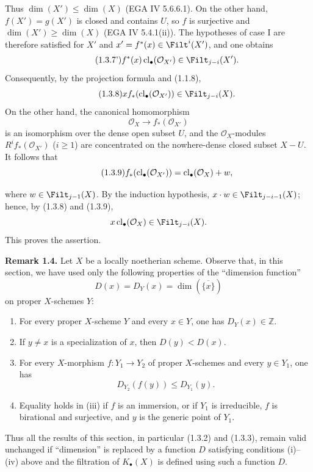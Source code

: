 Thus $\dim(X')\leq\dim(X)$ (EGA IV 5.6.6.1). On the other hand,
$f(X')=g(X')$ is closed and contains $U$, so $f$ is surjective and
$\dim(X')\geq\dim(X)$ (EGA IV 5.4.1(ii)). The hypotheses of case I are
therefore satisfied for $X'$ and $x'=f^*(x)\in\Filt^i(X')$, and one obtains
\begin{equation}\tag{1.3.7'}
f^*(x)\cl_\bullet(\mathcal O_{X'})\in\Filt_{j-i}(X').
\end{equation}
Consequently, by the projection formula and (1.1.8),
\begin{equation}\tag{1.3.8}
x f_*(\cl_\bullet(\mathcal O_{X'}))\in\Filt_{j-i}(X).
\end{equation}
On the other hand, the canonical homomorphism
\[
\mathcal O_X\longrightarrow f_*(\mathcal O_{X'})
\]
is an isomorphism over the dense open subset $U$, and the
$\mathcal O_X$-modules $R^if_*(\mathcal O_{X'})$ ($i\geq1$) are concentrated
on the nowhere-dense closed subset $X-U$. It follows that
\begin{equation}\tag{1.3.9}
f_*(\operatorname{cl}_\bullet(\mathcal O_{X'}))=\operatorname{cl}_\bullet(\mathcal O_X)+w,
\end{equation}

where $w\in\Filt_{j-1}(X)$. By the induction hypothesis,
$x\cdot w\in\Filt_{j-i-1}(X)$; hence, by (1.3.8) and (1.3.9),
\[
x\cl_\bullet(\mathcal O_X)\in\Filt_{j-i}(X).
\]
This proves the assertion.

\textbf{Remark 1.4.}
Let $X$ be a locally noetherian scheme. Observe that, in this section, we
have used only the following properties of the ``dimension function''
\[
D(x)=D_Y(x)=\dim(\overline{\{x\}})
\]
on proper $X$-schemes $Y$:
\begin{enumerate}[label=(\roman*)]
\item For every proper $X$-scheme $Y$ and every $x\in Y$, one has
  $D_Y(x)\in\mathbb Z$.
\item If $y\ne x$ is a specialization of $x$, then $D(y)<D(x)$.
\item For every $X$-morphism $f:Y_1\to Y_2$ of proper $X$-schemes and every
  $y\in Y_1$, one has
  \[
  D_{Y_2}(f(y))\leq D_{Y_1}(y).
  \]
\item Equality holds in (iii) if $f$ is an immersion, or if $Y_1$ is
  irreducible, $f$ is birational and surjective, and $y$ is the generic point
  of $Y_1$.
\end{enumerate}
Thus all the results of this section, in particular (1.3.2) and (1.3.3),
remain valid unchanged if ``dimension'' is replaced by a function $D$
satisfying conditions (i)--(iv) above and the filtration of $K_\bullet(X)$ is
defined using such a function $D$.

